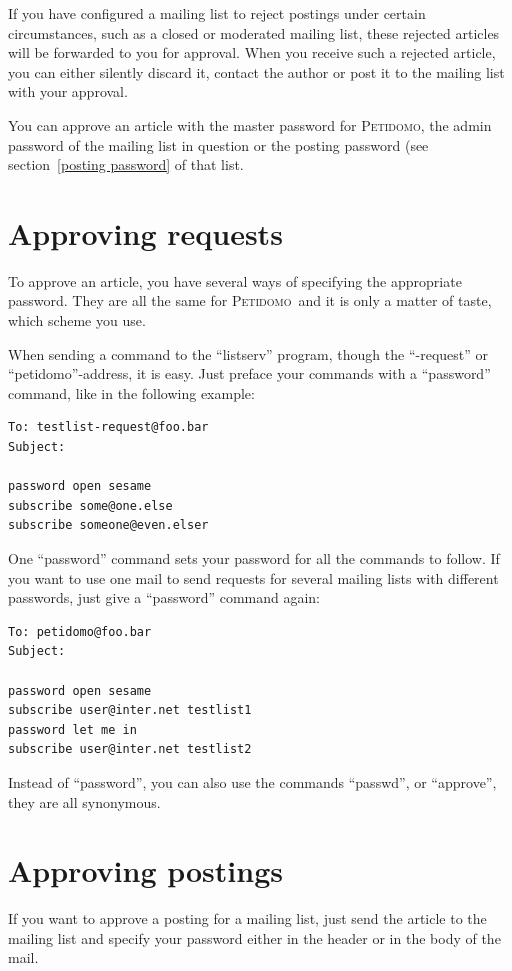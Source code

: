 \documentclass[a4paper,10pt]{scrreprt}
\newcommand{\Petidomo}{{\scshape Peti\-domo}}
\begin{document}
If you have configured a mailing list to reject postings under certain
circumstances, such as a closed or moderated mailing list, these
rejected articles will be forwarded to you for approval. When you
receive such a rejected article, you can either silently
discard it, contact the author or post it to the mailing list with
your approval.

You can approve an article with the master password for \Petidomo, the
admin password of the mailing list in question or the posting password
(see section~\ref{posting password} of that list.

\section{Approving requests}
\label{approve}

To approve an article, you have several ways of specifying the
appropriate password. They are all the same for \Petidomo\ and it is
only a matter of taste, which scheme you use.

When sending a command to the ``listserv'' program, though the
``-request'' or ``petidomo''-address, it is easy. Just preface your
commands with a ``password'' command, like in the
following example:
\begin{verbatim}
To: testlist-request@foo.bar
Subject:

password open sesame
subscribe some@one.else
subscribe someone@even.elser
\end{verbatim}

One ``password'' command sets your password for all the commands to
follow. If you want to use one mail to send requests for several
mailing lists with different passwords, just give a ``password''
command again:
\begin{verbatim}
To: petidomo@foo.bar
Subject:

password open sesame
subscribe user@inter.net testlist1
password let me in
subscribe user@inter.net testlist2
\end{verbatim}

Instead of ``password'', you can also use the commands ``passwd'', or
``approve'', they are all synonymous.

\section{Approving postings}

If you want to approve a posting for a mailing list, just send the
article to the mailing list and specify your password either in the
header or in the body of the mail.
\end{document}
